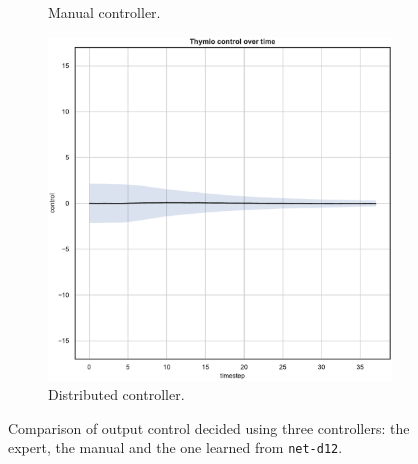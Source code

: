 \begin{figure}[!htb]
\begin{subfigure}[h]{0.3\textwidth}
		\caption{Manual controller.}
	\end{subfigure}
	\hfill
	\begin{subfigure}[h]{0.3\textwidth}
		\centering
		\includegraphics[width=\textwidth]{contents/images/net-d12/control-overtime-learned_distributed}
		\caption{Distributed controller.}
	\end{subfigure}
	\caption[Evaluation of the control decided by \texttt{net-d12}.]{Comparison 
		of output control decided using three controllers: the expert, the 
		manual and the one learned from \texttt{net-d12}.}
	\label{fig:net-d12control}
\end{figure}

